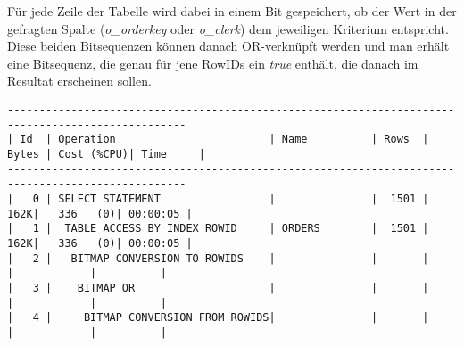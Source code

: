 \documentclass[11pt,a4paper,parskip=half]{scrartcl}
\begin{document}
Für jede Zeile der Tabelle wird dabei in einem Bit gespeichert, ob der Wert in der gefragten Spalte (\emph{o\_orderkey} oder \emph{o\_clerk}) dem jeweiligen Kriterium entspricht. Diese beiden Bitsequenzen können danach  OR-verknüpft werden und man erhält eine Bitsequenz, die genau für jene RowIDs ein \emph{true} enthält, die danach im Resultat erscheinen sollen.

\begin{lstlisting}
--------------------------------------------------------------------------------------------------                                                                                                                                                                                                           
| Id  | Operation                        | Name          | Rows  | Bytes | Cost (%CPU)| Time     |                                                                                                                                                                                                           
--------------------------------------------------------------------------------------------------                                                                                                                                                                                                           
|   0 | SELECT STATEMENT                 |               |  1501 |   162K|   336   (0)| 00:00:05 |                                                                                                                                                                                                           
|   1 |  TABLE ACCESS BY INDEX ROWID     | ORDERS        |  1501 |   162K|   336   (0)| 00:00:05 |                                                                                                                                                                                                           
|   2 |   BITMAP CONVERSION TO ROWIDS    |               |       |       |            |          |                                                                                                                                                                                                           
|   3 |    BITMAP OR                     |               |       |       |            |          |                                                                                                                                                                                                           
|   4 |     BITMAP CONVERSION FROM ROWIDS|               |       |       |            |          |                                                                                                                                                                                                           

\end{lstlisting}
\end{document}
